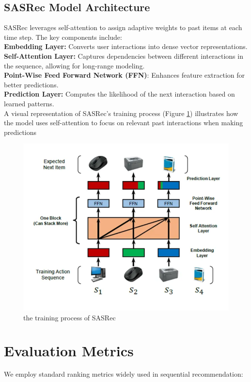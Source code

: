 \subsection{SASRec Model Architecture}
SASRec leverages self-attention to assign adaptive weights to past items at each time step. The key components include:\\
\textbf{ Embedding Layer:} Converts user interactions into dense vector representations. \\
\textbf{ Self-Attention Layer: }Captures dependencies between different interactions in the sequence, allowing for long-range modeling.\\
\textbf{ Point-Wise Feed Forward Network (FFN)}: Enhances feature extraction for better predictions.\\
\textbf{Prediction Layer:} Computes the likelihood of the next interaction based on learned patterns.\\
A visual representation of SASRec’s training process (Figure \ref{the_training_process_of_SASRec}) illustrates how the model uses self-attention to focus on relevant past interactions when making predictions
\begin{figure}[ht]
	\centering
	\includegraphics[width=0.6\linewidth]{Figures/sasrec.png}
	\caption{the training process of SASRec\cite{kang2018selfat}}
	\label{the_training_process_of_SASRec}	
\end{figure}
\section{Evaluation Metrics}
We employ standard ranking metrics widely used in sequential recommendation:

